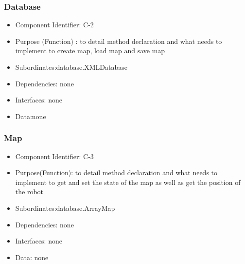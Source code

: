 \documentclass[11pt, a4paper]{report}
\begin{document}
\subsubsection{Database}
\begin{itemize}
\item Component Identifier: C-2 
\item Purpose (Function) : to detail method declaration and
what needs to implement to create map, load map and save map 
\item Subordinates:database.XMLDatabase
\item Dependencies: none
\item Interfaces: none
\item Data:none
\end{itemize}


\subsubsection{Map}
\begin{itemize}
\item Component Identifier:  C-3
\item Purpose(Function): to detail method declaration and what needs to implement 
to get and set the state of the map as well as get the position of the robot
\item Subordinates:database.ArrayMap
\item Dependencies: none
\item Interfaces: none
\item Data: none
\end{itemize}
\end{document}
